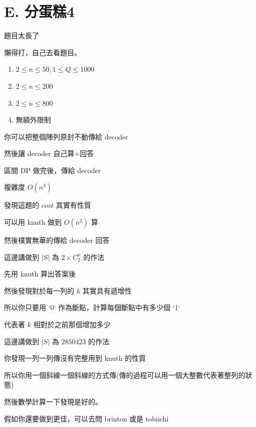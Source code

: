 \section{E. 分蛋糕4}

\begin{frame}{}
    題目太長了

    懶得打，自己去看題目。
\end{frame}

\begin{frame}{}
    \begin{enumerate}
        \item{$2 \le n \le 50, 1 \le Q \le 1000$}
        \item{$2 \le n \le 200$}
        \item{$2 \le n \le 800$}
        \item{無額外限制}
    \end{enumerate}
\end{frame}

\begin{frame}{}
    你可以把整個陣列原封不動傳給 decoder

    然後讓 decoder 自己算+回答
\end{frame}

\begin{frame}{}
    區間 DP 做完後，傳給 decoder

    複雜度 $O(n^3)$
\end{frame}

\begin{frame}{}
    發現這題的 $cost$ 其實有性質

    可以用 knuth 做到 $O(n^2)$ 算

    然後樸實無華的傳給 decoder 回答
\end{frame}

\begin{frame}{}
    這邊講做到 $\lvert S \rvert$ 為 $2 \times C^{n}_{2}$ 的作法

    先用 knuth 算出答案後

    然後發現對於每一列的 $k$ 其實具有遞增性

    所以你只要用 `0` 作為斷點，計算每個斷點中有多少個 `1`

    代表著 $k$ 相對於之前那個增加多少
\end{frame}

\begin{frame}{}
    這邊講做到 $\lvert S \rvert$ 為 $2850423$ 的作法

    你發現一列一列傳沒有完整用到 knuth 的性質

    所以你用一個斜線一個斜線的方式傳(傳的過程可以用一個大整數代表著整列的狀態)

    然後數學計算一下發現是好的。\pause

    假如你還要做到更佳，可以去問 brinton 或是 tobiichi
\end{frame}

